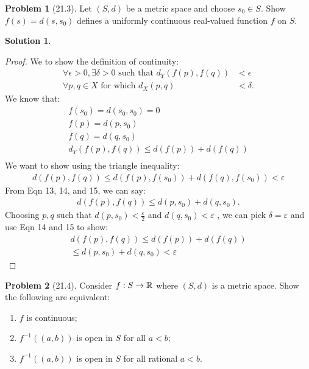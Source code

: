\documentclass[12pt]{article}
\theoremstyle{definition} %
\newtheorem{solution}{Solution}
\newtheorem{problem}{Problem}
\theoremstyle{plain} %
\begin{document}
\begin{problem}[21.3]
    Let \((S,d)\) be a metric space and choose \(s_{0} \in S\). Show \(f(s)=d(s,s_{0})\) defines a uniformly continuous real-valued function \(f\) on \(S\).
\end{problem}
\begin{solution}
\begin{proof}
  We to show the definition of continuity:
  \begin{align}
    \forall \epsilon > 0, \exists \delta > 0 \text{ such that } d_Y(f(p), f(q)) &< \epsilon \\
    \forall p, q \in X \text{ for which } d_X(p, q) &< \delta. 
    \end{align}
    We know that:
    \begin{align}
      f(s_0) = d(s_0, s_0) = 0 \\[10pt] 
      f(p)= d(p, s_0) \\[10pt] 
      f(q)= d(q, s_0) \\[10pt] 
      d_Y(f(p),f(q))\leq d(f(p)) + d(f(q))\\[10pt] 
    \end{align}
We want to show using the triangle inequality:
\begin{align} 
      d(f(p),f(q))\leq d(f(p),f(s_0))+d(f(q),f(s_0))< \varepsilon
\end{align}
From Eqn 13, 14, and 15, we can say: 
\begin{align}
  d(f(p),f(q))\leq d(p,s_0)+d(q,s_0).
\end{align}
Choosing \(p,q\) such that \(d(p,s_0)<\frac{\varepsilon}{2}\) and \(d(q,s_0)<\varepsilon\) , we can pick \(\delta =\varepsilon\) and use Eqn 14 and 15 to show:
\begin{align}
  d(f(p),f(q))\leq d(f(p))+d(f(q))\\[10pt] 
  \leq d(p,s_0)+d(q,s_0)<\varepsilon
\end{align} 
\end{proof}
\end{solution}
\begin{problem}[21.4]
    Consider \(f:S\to \mathbb{\MakeUppercase{r}} \) where \((S,d)\) is a metric space. Show the following are equivalent:
    \begin{enumerate}
        \item \(f\) is continuous;
        \item \(f^{-1}((a,b)) \) is open in \(S\) for all \(a<b\);
        \item \(f^{-1}((a,b))\) is open in \(S\) for all rational \(a<b\).
    \end{enumerate}
\end{problem}
\end{document}
